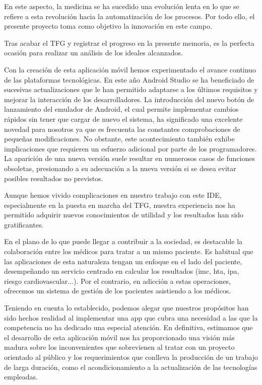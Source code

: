 \documentclass[11pt,spanish,
		listoftables,listoffigures]
		{tfgplantilla}
\begin{document}
En este aspecto, la medicina se ha sucedido una evolución lenta en lo que se refiere a esta revolución hacia la automatización de los procesos. Por todo ello, el presente proyecto toma como objetivo la innovación en este campo.

Tras acabar el TFG y registrar el progreso en la presente memoria, es la perfecta ocasión para realizar un análisis de los ideales alcanzados.

Con la creación de esta aplicación móvil hemos experimentado el avance continuo de las plataformas tecnológicas. En este año Android Studio se ha beneficiado de sucesivas actualizaciones que le han permitido adaptarse a los últimos requisitos y mejorar la interacción de los desarrolladores. La introducción del nuevo botón de lanzamiento del emulador de Android, el cual permite implementar cambios rápidos sin tener que cargar de nuevo el sistema, ha significado una excelente novedad para nosotros ya que es frecuenta las constantes comprobaciones de pequeñas modificaciones. No obstante, este acontecimiento también exhibe implicaciones que requieren un esfuerzo adicional por parte de los programadores. La aparición de una nueva versión suele resultar en numerosos casos de funciones obsoletas, presionando a su adecuación a la nueva versión si se desea evitar posibles resultados no previstos.

Aunque hemos vivido complicaciones en nuestro trabajo con este IDE, especialmente en la puesta en marcha del TFG, nuestra experiencia nos ha permitido adquirir nuevos conocimientos de utilidad y los resultados han sido gratificantes. 

En el plano de lo que puede llegar a contribuir a la sociedad, es destacable la colaboración entre los médicos para tratar a un mismo paciente. Es habitual que las aplicaciones de esta naturaleza tengan un enfoque en el lado del paciente, desempeñando un servicio centrado en calcular los resultados (imc, hta, ipa, riesgo cardiovascular...). Por el contrario, en adicción a estas operaciones, ofrecemos un sistema de gestión de los pacientes asistiendo a los médicos.

Teniendo en cuenta lo establecido, podemos alegar que nuestros propósitos han sido hechos realidad al implementar una app que cubra una necesidad a las que la competencia no ha dedicado una especial atención.
En definitiva, estimamos que el desarrollo de esta aplicación móvil nos ha proporcionado una visión más madura sobre los inconvenientes que sobrevienen al tratar con un proyecto orientado al público y los requerimientos que conlleva la producción de un trabajo de larga duración, como el acondicionamiento a la actualización de las tecnologías empleadas.
\end{document}
